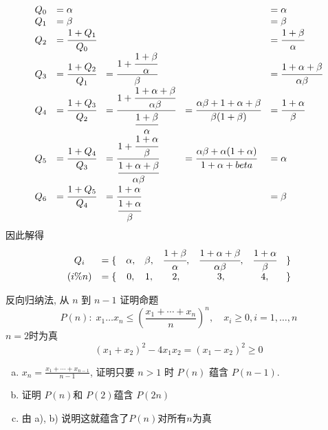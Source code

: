 \begin{answer}
	\begin{equation*}
		\begin{array}{lllll}
			Q_0 &= \alpha & & &= \alpha\\
			Q_1 &= \beta  & & &= \beta\\
			Q_2 &= \cfrac{1+Q_1}{Q_0} & &&= \cfrac{1+\beta}{\alpha} \\
			Q_3 &= \cfrac{1+Q_2}{Q_1} &= \cfrac{1+\cfrac{1+\beta}{\alpha}}{\beta} 
			&&= \cfrac{1+\alpha+\beta}{\alpha\beta} \\
			Q_4 &= \cfrac{1+Q_3}{Q_2} 
			&= \cfrac{1+\cfrac{1+\alpha+\beta}{\alpha\beta} }{\cfrac{1+\beta}{\alpha}}
			&= \cfrac{\alpha\beta+1+\alpha+\beta}{\beta(1+\beta)} 
			&= \cfrac{1+\alpha}{\beta} \\
			Q_5 &= \cfrac{1+Q_4}{Q_3} 
			&= \cfrac{1+\cfrac{1+\alpha}{\beta}}{ \cfrac{1+\alpha+\beta}{\alpha\beta}}
			&= \cfrac{\alpha\beta+\alpha(1+\alpha)}{1+\alpha+beta} &= \alpha \\
			Q_6 &= \cfrac{1+Q_5}{Q_4} &= \cfrac{1+\alpha}{\cfrac{1+\alpha}{\beta}} & &= \beta\\
		\end{array}
	\end{equation*}
	因此解得 
	\begin{equation*}
		\begin{array}{clcccccc}
			Q_i &= \{ &\alpha ,& \beta ,& \cfrac{1+\beta}{\alpha} ,& \cfrac{1+\alpha+\beta}{\alpha\beta} ,& \cfrac{1+\alpha}{\beta} & \}\\
			(i\%n) &= \{ & 0 ,& 1 ,& 2 ,& 3 ,& 4 ,& \}\\
		\end{array}
	\end{equation*}
\end{answer}	

\begin{exercise}
		反向归纳法, 从 $ n $ 到 $  n-1 $ 证明命题
	\begin{equation*}
		P(n) : \; x_{1} \dots x_{n} \leqslant \left( \frac{x_{1}+\cdots+x_{n}}{n}\right) ^n, \quad x_i \geqslant 0, i=1,\dots,n
	\end{equation*}
	$ n=2 $时为真 
	\begin{equation*}
		(x_{1}+x_{2})^2-4x_{1}x_{2} = (x_{1}-x_{2})^2 \geqslant 0
	\end{equation*}
	\begin{enumerate}[a)]
		\item $ x_n = \frac{x_{1}+\cdots+x_{n-1}}{n-1} $, 证明只要 $ n>1 $ 时 $ P(n) $ 蕴含 $ P(n-1) $.
		\item 证明 $ P(n) $和 $ P(2) $蕴含 $ P(2n) $
		\item 由 a), b) 说明这就蕴含了$ P(n) $对所有$ n $为真
	\end{enumerate}
\end{exercise}

